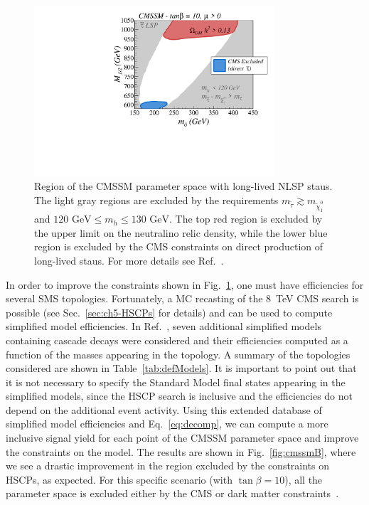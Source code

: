 \begin{figure}[t]
\centering
\includegraphics[width=0.8\textwidth]{ch5-figures/sms_exclusion_direct.pdf}
\caption{Region of the CMSSM parameter space with long-lived NLSP staus.
The light gray regions are excluded by the requirements $m_{\tilde \tau} \gtrsim
m_{\tilde \chi_1^0}$ and $ 120 \mbox{ GeV} \leq m_h \leq 130 \mbox{ GeV}$.
The top red region is excluded by the upper limit on the neutralino relic
density, while the lower blue region is excluded by the CMS constraints
on direct production of long-lived staus. For more details see Ref.~\cite{Heisig:2015yla}.
}
\label{fig:cmssmA}
\end{figure}


In order to improve the constraints shown in Fig.~\ref{fig:cmssmA}, one must
have efficiencies for several SMS topologies. Fortunately, a MC
recasting of the 8~TeV CMS search is possible (see Sec.~\ref{sec:ch5-HSCPs} for details)
and can be used to compute simplified model efficiencies.
In Ref.~\cite{Heisig:2015yla}, seven additional simplified models containing
cascade decays were considered and their efficiencies computed as a function of
the masses appearing in the topology. A summary of the topologies considered
are shown in Table~\ref{tab:defModels}. It is important to point out that
it is not necessary to specify the Standard Model final states appearing in the
simplified models, since the HSCP search is inclusive and the efficiencies
do not depend on the additional event activity.
Using this extended database of simplified model efficiencies
and Eq.~\eqref{eq:decomp}, we can compute a more inclusive signal yield for each
point of the CMSSM parameter space and improve the constraints on the model.
The results are shown in Fig.~\ref{fig:cmssmB}, where
we see a drastic improvement in the region excluded by
the constraints on HSCPs, as expected.
For this specific scenario (with
$\tan\beta = 10$), all the parameter space is excluded either by the CMS or dark matter
constraints~\cite{Heisig:2015yla}.



